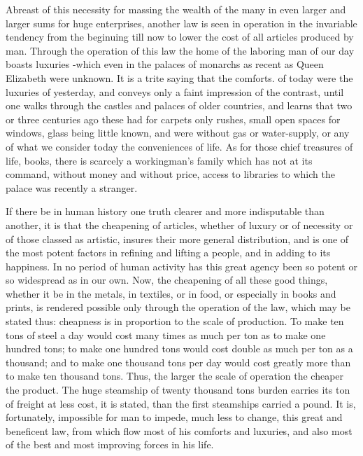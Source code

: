 \documentclass[11pt,openany]{book}
\begin{document}
Abreast of this necessity for massing the wealth of the many in even larger and larger sums for huge enterprises, another law is seen in operation in the invariable tendency from the beginuing till now to lower the cost of all articles produced by man. Through the operation of this law the home of the laboring man of our day boasts luxuries -which even in the palaces of monarchs as recent as Queen Elizabeth were unknown. It is a trite saying that the comforts. of today were the luxuries of yesterday, and conveys only a faint impression of the contrast, until one walks through the castles and palaces of older countries, and learns that two or three centuries ago these had for carpets only rushes, small open spaces for windows, glass being little known, and were without gas or water-supply, or any of what we consider today the conveniences of life. As for those chief treasures of life, books, there is scarcely a workingman's family which has not at its command, without money and without price, access to libraries to which the palace was recently a stranger.

If there be in human history one truth clearer and more indisputable than another, it is that the cheapening of articles, whether of luxury or of necessity or of those classed as artistic, insures their more general distribution, and is one of the most potent factors in refining and lifting a people, and in adding to its happiness. In no period of human activity has this great agency been so potent or so widespread as in our own. Now, the cheapening of all these good things, whether it be in the metals, in textiles, or in food, or especially in books and prints, is rendered possible only through the operation of the law, which may be stated thus: cheapness is in proportion to the scale of production. To make ten tons of steel a day would cost many times as much per ton as to make one hundred tons; to make one hundred tons would cost double as much per ton as a thousand; and to make one thousand tons per day would cost greatly more than to make ten thousand tons. Thus, the larger the scale of operation the cheaper the product. The huge steamship of twenty thousand tons burden earries its ton of freight at less cost, it is stated, than the first steamships carried a pound. It is, fortunately, impossible for man to impede, much less to change, this great and beneficent law, from which flow most of his comforts and luxuries, and also most of the best and most improving forces in his life.
\end{document}
